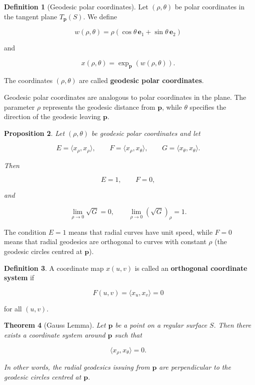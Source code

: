 \documentclass[10pt, a4paper]{article}
\theoremstyle{plain}
\newtheorem{theorem}{Theorem}[section]
\newtheorem{proposition}[theorem]{Proposition}
\theoremstyle{definition}
\newtheorem{definition}[theorem]{Definition}
\theoremstyle{remark}
\newenvironment{sidenote}{%
  \par\vspace{0.5em}%
  \noindent\color{defcolor}%
}{%
  \par\vspace{0.5em}%
  \color{black}%
}
\begin{document}
\begin{definition}[Geodesic polar coordinates]
Let $(\rho,\theta)$ be polar coordinates in the tangent plane $T_\mathbf{p}(S)$.
We define

\[
w(\rho,\theta) = \rho(\cos\theta\,\mathbf{e}_1 + \sin\theta\,\mathbf{e}_2)
\]

and

\[
x(\rho,\theta) = \exp_\mathbf{p}(w(\rho,\theta)).
\]

The coordinates $(\rho,\theta)$ are called \textbf{geodesic polar coordinates}.
\end{definition}

\begin{sidenote}
Geodesic polar coordinates are analogous to polar coordinates in the plane. 
The parameter $\rho$ represents the geodesic distance from $\mathbf{p}$, 
while $\theta$ specifies the direction of the geodesic leaving $\mathbf{p}$.
\end{sidenote}

\begin{proposition}
Let $(\rho,\theta)$ be geodesic polar coordinates and let

\[
E = \langle x_\rho, x_\rho \rangle,
\qquad
F = \langle x_\rho, x_\theta \rangle,
\qquad
G = \langle x_\theta, x_\theta \rangle .
\]

Then

\[
E = 1, 
\qquad
F = 0,
\]

and

\[
\lim_{\rho \to 0} \sqrt{G} = 0,
\qquad
\lim_{\rho \to 0} (\sqrt{G})_\rho = 1 .
\]
\end{proposition}

\begin{sidenote}
The condition $E=1$ means that radial curves have unit speed, while $F=0$ 
means that radial geodesics are orthogonal to curves with constant $\rho$ 
(the geodesic circles centred at $\mathbf{p}$).
\end{sidenote}

\begin{definition}
A coordinate map $x(u,v)$ is called an \textbf{orthogonal coordinate system} 
if

\[
F(u,v) = \langle x_u, x_v \rangle = 0
\]

for all $(u,v)$.
\end{definition}

\begin{theorem}[Gauss Lemma]
Let $\mathbf{p}$ be a point on a regular surface $S$. Then there exists a 
coordinate system around $\mathbf{p}$ such that

\[
\langle x_\rho, x_\theta \rangle = 0 .
\]

In other words, the radial geodesics issuing from $\mathbf{p}$ are 
perpendicular to the geodesic circles centred at $\mathbf{p}$.
\end{theorem}
\end{document}
